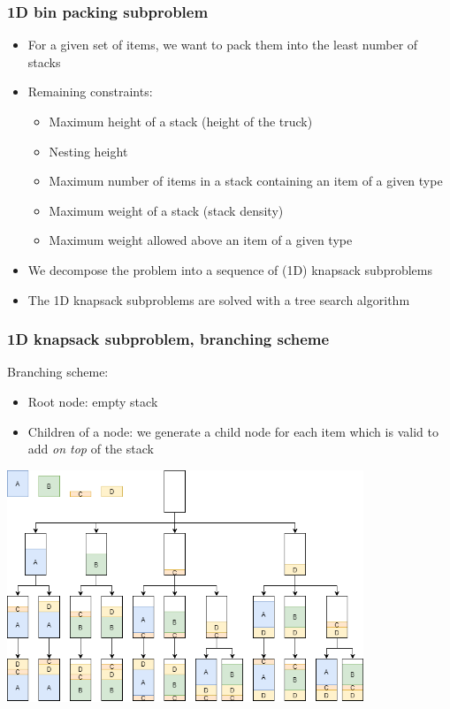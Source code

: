 \documentclass[10pt]{beamer}
\begin{document}
\begin{frame}
  \frametitle{1D bin packing subproblem}

  \begin{itemize}
    \item For a given set of items, we want to pack them into the least number of stacks
    \item Remaining constraints:
      \begin{itemize}
        \item Maximum height of a stack (height of the truck)
        \item Nesting height
        \item Maximum number of items in a stack containing an item of a given type
        \item Maximum weight of a stack (stack density)
        \item Maximum weight allowed above an item of a given type
      \end{itemize}
    \item We decompose the problem into a sequence of (1D) knapsack subproblems
    \item The 1D knapsack subproblems are solved with a tree search algorithm
  \end{itemize}
\end{frame}

\begin{frame}
  \frametitle{1D knapsack subproblem, branching scheme}

  Branching scheme:
  \begin{itemize}
    \item Root node: empty stack
    \item Children of a node: we generate a child node for each item which is valid to add \emph{on top} of the stack
  \end{itemize}

  \begin{center}
    \includegraphics[width=0.8\textwidth]{img/branching_scheme_1d.png}
  \end{center}
\end{frame}
\end{document}
